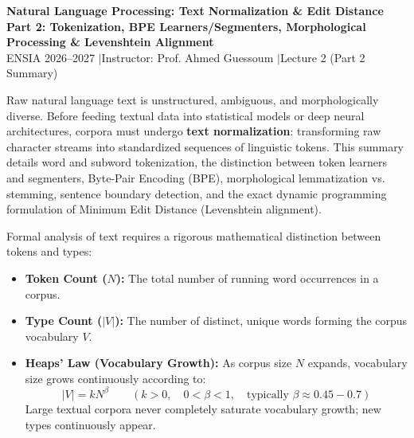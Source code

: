 \documentclass[10pt,a4paper]{article}
\begin{document}
\begin{center}
    \vspace{-4pt}
    {\LARGE\bfseries\color{themeblue} Natural Language Processing: Text Normalization \& Edit Distance}\\[1.5pt]
    {\normalsize\bfseries Part 2: Tokenization, BPE Learners/Segmenters, Morphological Processing \& Levenshtein Alignment}\\[1.5pt]
    {\footnotesize\color{darkgray} ENSIA 2026--2027 \quad$\vert$\quad Instructor: Prof. Ahmed Guessoum \quad$\vert$\quad Lecture 2 (Part 2 Summary)}
\end{center}

\vspace{-7pt}

\begin{overviewbox}
\footnotesize
Raw natural language text is unstructured, ambiguous, and morphologically diverse. Before feeding textual data into statistical models or deep neural architectures, corpora must undergo \textbf{text normalization}: transforming raw character streams into standardized sequences of linguistic tokens. This summary details word and subword tokenization, the distinction between token learners and segmenters, Byte-Pair Encoding (BPE), morphological lemmatization vs. stemming, sentence boundary detection, and the exact dynamic programming formulation of Minimum Edit Distance (Levenshtein alignment).
\end{overviewbox}

\vspace{-3pt}

\par\vspace{1pt}
Formal analysis of text requires a rigorous mathematical distinction between tokens and types:
\begin{itemize}[leftmargin=12pt, itemsep=1pt, parsep=0pt, topsep=1pt]
    \item \textbf{Token Count ($N$):} The total number of running word occurrences in a corpus.
    \item \textbf{Type Count ($|V|$):} The number of distinct, unique words forming the corpus vocabulary $V$.
    \item \textbf{Heaps' Law (Vocabulary Growth):} As corpus size $N$ expands, vocabulary size grows continuously according to:
    \[
    |V| = k N^\beta \qquad (k > 0, \quad 0 < \beta < 1, \quad \text{typically } \beta \approx 0.45 - 0.7)
    \]
    Large textual corpora never completely saturate vocabulary growth; new types continuously appear.
\end{itemize}
\end{document}
